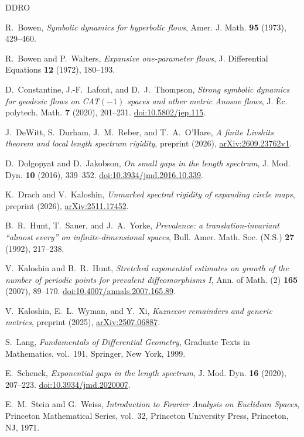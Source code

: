\begin{thebibliography}{DDRO}

 R.~Bowen, \emph{Symbolic dynamics for hyperbolic flows}, Amer. J. Math. \textbf{95} (1973), 429--460.

 R.~Bowen and P.~Walters, \emph{Expansive one-parameter flows}, J. Differential Equations \textbf{12} (1972), 180--193.

 D.~Constantine, J.-F.~Lafont, and D.~J.~Thompson, \emph{Strong symbolic dynamics for geodesic flows on CAT$(-1)$ spaces and other metric Anosov flows}, J. \`Ec. polytech. Math. \textbf{7} (2020), 201--231. \href{https://doi.org/10.5802/jep.115}{doi:10.5802/jep.115}.

 J.~DeWitt, S.~Durham, J.~M.~Reber, and T.~A.~O'Hare, \emph{A finite Livshits theorem and local length spectrum rigidity}, preprint (2026), \href{https://arxiv.org/abs/2609.23762v1}{arXiv:2609.23762v1}.

 D.~Dolgopyat and D.~Jakobson, \emph{On small gaps in the length spectrum}, J. Mod. Dyn. \textbf{10} (2016), 339--352. \href{https://doi.org/10.3934/jmd.2016.10.339}{doi:10.3934/jmd.2016.10.339}.

 K.~Drach and V.~Kaloshin, \emph{Unmarked spectral rigidity of expanding circle maps}, preprint (2026), \href{https://arxiv.org/abs/2511.17452}{arXiv:2511.17452}.

 B.~R.~Hunt, T.~Sauer, and J.~A.~Yorke, \emph{Prevalence: a translation-invariant ``almost every'' on infinite-dimensional spaces}, Bull. Amer. Math. Soc. (N.S.) \textbf{27} (1992), 217--238.

 V.~Kaloshin and B.~R.~Hunt, \emph{Stretched exponential estimates on growth of the number of periodic points for prevalent diffeomorphisms I}, Ann. of Math. (2) \textbf{165} (2007), 89--170. \href{https://doi.org/10.4007/annals.2007.165.89}{doi:10.4007/annals.2007.165.89}.

 V.~Kaloshin, E.~L.~Wyman, and Y.~Xi, \emph{Kuznecov remainders and generic metrics}, preprint (2025), \href{https://arxiv.org/abs/2507.06887}{arXiv:2507.06887}.

 S.~Lang, \emph{Fundamentals of Differential Geometry}, Graduate Texts in Mathematics, vol.~191, Springer, New York, 1999.

 E.~Schenck, \emph{Exponential gaps in the length spectrum}, J. Mod. Dyn. \textbf{16} (2020), 207--223. \href{https://doi.org/10.3934/jmd.2020007}{doi:10.3934/jmd.2020007}.

 E.~M.~Stein and G.~Weiss, \emph{Introduction to Fourier Analysis on Euclidean Spaces}, Princeton Mathematical Series, vol.~32, Princeton University Press, Princeton, NJ, 1971.

\end{thebibliography}
